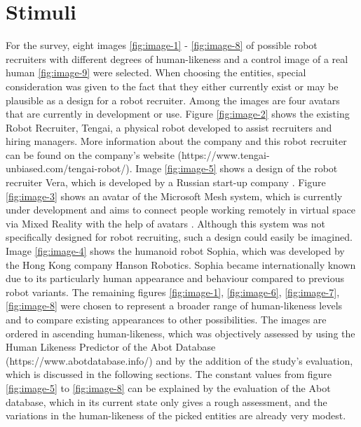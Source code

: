 \section{Stimuli}
For the survey, eight images \ref{fig:image-1} - \ref{fig:image-8} of possible robot recruiters with different degrees of human-likeness and a control image of a real human \ref{fig:image-9} were selected. When choosing the entities, special consideration was given to the fact that they either currently exist or may be plausible as a design for a robot recruiter. Among the images are four avatars that are currently in development or use. Figure \ref{fig:image-2} shows the existing Robot Recruiter, Tengai, a physical robot developed to assist recruiters and hiring managers. More information about the company and this robot recruiter can be found on the company's website (https://www.tengai-unbiased.com/tengai-robot/). Image \ref{fig:image-5} shows a design of the robot recruiter Vera, which is developed by a Russian start-up company \cite{vera}. Figure \ref{fig:image-3} shows an avatar of the Microsoft Mesh system, which is currently under development and aims to connect people working remotely in virtual space via Mixed Reality with the help of avatars \cite{microsoft_mesh}. Although this system was not specifically designed for robot recruiting, such a design could easily be imagined. Image \ref{fig:image-4} shows the humanoid robot Sophia, which was developed by the Hong Kong company Hanson Robotics. Sophia became internationally known due to its particularly human appearance and behaviour compared to previous robot variants. The remaining figures \ref{fig:image-1}, \ref{fig:image-6}, \ref{fig:image-7}, \ref{fig:image-8} were chosen to represent a broader range of human-likeness levels and to compare existing appearances to other possibilities. The images are ordered in ascending human-likeness, which was objectively assessed by using the Human Likeness Predictor of the Abot Database (https://www.abotdatabase.info/) and by the addition of the study's evaluation, which is discussed in the following sections. The constant values from figure \ref{fig:image-5} to \ref{fig:image-8} can be explained by the evaluation of the Abot database, which in its current state only gives a rough assessment, and the variations in the human-likeness of the picked entities are already very modest.
\begin{table}[b!]
\centering
{}
\caption{Rated human-likeness of the figures.}
\label{tab:rated-human-likeness}
\end{table}
\newpage

